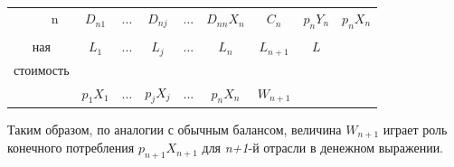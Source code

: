 \documentclass[12pt, 4paper]{book}
\begin{document}
{\begin{table}[h]
\begin{tabular}[center]{|p{0.2in}|p{0.2in}|p{0.2in}|p{0.2in}|p{0.2in}|p{0.2in}|p{0.2in}|p{0.2in}|p{0.3in}|p{0.3in}|}
		\multicolumn{1}{|c|}{} & \multicolumn{1}{c|}{n}  & \multicolumn{1}{c|}{$D_{n1}$} & \multicolumn{1}{c|}{...} & \multicolumn{1}{c|}{$D_{nj}$} & \multicolumn{1}{c|}{...} & \multicolumn{1}{c|}{$D_{nn}X_n$} & \multicolumn{1}{c|}{$C_n$} & \multicolumn{1}{c|}{$p_nY_n$} & \multicolumn{1}{c|}{$p_nX_n$}\\ \hhline{----------} 
		\multicolumn{2}{|c|}{{\tiny Добавоч-}}  & \multicolumn{1}{c|}{} & \multicolumn{1}{c|}{} & \multicolumn{1}{c|}{} & \multicolumn{1}{c|}{} & \multicolumn{1}{c|}{}& \multicolumn{1}{c|}{} & \multicolumn{1}{c|}{} & \multicolumn{1}{c|}{}\\  
		\multicolumn{2}{|c|}{{\tiny ная}}  & \multicolumn{1}{c|}{$L_1$} & \multicolumn{1}{c|}{...} & \multicolumn{1}{c|}{$L_j$} & \multicolumn{1}{c|}{...} & \multicolumn{1}{c|}{$L_n$}  & \multicolumn{1}{c|}{$L_{n+1}$} & \multicolumn{1}{c|}{$L$} & \multicolumn{1}{c|}{}\\ 
		\multicolumn{2}{|c|}{{\tiny стоимость}}  & \multicolumn{1}{c|}{} & \multicolumn{1}{c|}{} & \multicolumn{1}{c|}{} & \multicolumn{1}{c|}{} & \multicolumn{1}{c|}{} & \multicolumn{1}{c|}{} & \multicolumn{1}{c|}{} & \multicolumn{1}{c|}{}\\ \hline
		\multicolumn{2}{|c|}{}  & \multicolumn{1}{c|}{$ p_1X_1 $} & \multicolumn{1}{c|}{...} & \multicolumn{1}{c|}{$ p_jX_j $} & \multicolumn{1}{c|}{...} & \multicolumn{1}{c|}{$ p_nX_n $} & \multicolumn{1}{c|}{$W_{n+1}$} & \multicolumn{1}{c|}{} & \multicolumn{1}{c|}{}\\ \hline
	\end{tabular}
\end{table}
\par

Таким образом, по аналогии с обычным балансом, величина $ W_{n+1} $ играет роль конечного потребления $ p_{n+1}X_{n+1} $ для \textit{n+1}-й отрасли в денежном выражении.
\par

}
\end{document}
